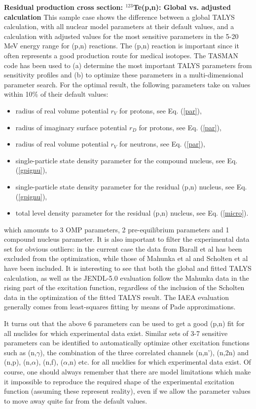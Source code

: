 \begin{samplecase}
{\bf Residual production cross section: ${}^{123}$Te(p,n): Global vs. adjusted calculation}\newline
This sample case shows the difference between a global TALYS calculation, with all nuclear model 
parameters at their default values, and a calculation with adjusted values for the most sensitive parameters 
in the 5-20 MeV energy range for (p,n) reactions. 
The (p,n) reaction is important since it often represents a good production route for medical isotopes.
The TASMAN code\cite{Koning2019} has been used to (a) determine the most important TALYS parameters from sensitivity profiles and 
(b) to optimize these parameters in a multi-dimensional parameter search. 
For the optimal result, the following parameters take on values within 10\% of their default values:
\begin{itemize}
\item radius of real volume potential $r_{V}$ for protons, see Eq. (\ref{par}),
\item radius of imaginary surface potential $r_{D}$ for protons, see Eq. (\ref{par}),
\item radius of real volume potential $r_{V}$ for neutrons, see Eq. (\ref{par}),
\item single-particle state density parameter for the compound nucleus, see Eq. (\ref{gpignu}),
\item single-particle state density parameter for the residual (p,n) nucleus, see Eq. (\ref{gpignu}),
\item total level density parameter for the residual (p,n) nucleus, see Eq. (\ref{micro}).
\end{itemize}
which amounts to 3 OMP parameters, 2 pre-equilibrium parameters and 1 compound nucleus parameter.
It is also important to filter the experimental data set for obvious outliers: in the current case the data from 
Barall et al\cite{Barall1981} has been excluded from the optimization, while those of Mahunka et al\cite{Mahunka1996} and 
Scholten et al\cite{Scholten1989} have been included.
It is interesting to see that both the global and fitted TALYS calculation, as well as the JENDL-5.0 evaluation \cite{JENDL5} 
follow the Mahunka data in the rising part of the excitation function, regardless of the inclusion of the Scholten data in the 
optimization of the fitted TALYS result. The IAEA evaluation \cite{IAEAmed} generally comes from least-squares fitting by means of Pade approximations.

It turns out that the above 6 parameters can be used to get a good (p,n) fit for all nuclides for which experimental data exist. 
Similar sets of 3-7 sensitive parameters can be identified to automatically optimize other excitation functions such as 
(n,$\gamma$), the combination of the three correlated channels (n,n'), (n,2n) and (n,p), (n,$\alpha$), (n,f), ($\alpha$,n) 
etc. for all nucldies for which experimental data exist.
Of course, one should always remember that there are model limitations which make it impossible to reproduce the required 
shape of the experimental excitation function (assuming these represent reality), even if we allow the parameter values to 
move away quite far from the default values.


\end{samplecase}
